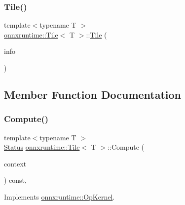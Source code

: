 \subsubsection{\texorpdfstring{Tile()}{Tile()}}
{\footnotesize\ttfamily template$<$typename T $>$ \\
\mbox{\hyperlink{structonnxruntime_1_1Tile}{onnxruntime\+::\+Tile}}$<$ T $>$\+::\mbox{\hyperlink{structonnxruntime_1_1Tile}{Tile}} (\begin{DoxyParamCaption}\item[{const \mbox{\hyperlink{classonnxruntime_1_1OpKernelInfo}{Op\+Kernel\+Info}} \&}]{info }\end{DoxyParamCaption})\hspace{0.3cm}{\ttfamily [inline]}}



\subsection{Member Function Documentation}
\mbox{\label{structonnxruntime_1_1Tile_a85996660410b4f15b9fe2a2f5c639d82}} 
\subsubsection{\texorpdfstring{Compute()}{Compute()}\hspace{0.1cm}{\footnotesize\ttfamily [1/2]}}
{\footnotesize\ttfamily template$<$typename T $>$ \\
\mbox{\hyperlink{classonnxruntime_1_1common_1_1Status}{Status}} \mbox{\hyperlink{structonnxruntime_1_1Tile}{onnxruntime\+::\+Tile}}$<$ T $>$\+::Compute (\begin{DoxyParamCaption}\item[{\mbox{\hyperlink{classonnxruntime_1_1OpKernelContext}{Op\+Kernel\+Context}} $\ast$}]{context }\end{DoxyParamCaption}) const\hspace{0.3cm}{\ttfamily [override]}, {\ttfamily [virtual]}}



Implements \mbox{\hyperlink{classonnxruntime_1_1OpKernel_a9eca8656a78b1b3ab9d3351a12798650}{onnxruntime\+::\+Op\+Kernel}}.

\mbox{\label{structonnxruntime_1_1Tile_aca70e841d7cf4fe244a5900d5395f840}} 
